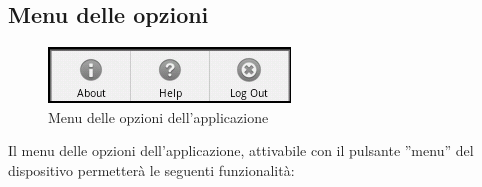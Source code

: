 \subsection{Menu delle opzioni}
	\label{optionsmenu}
	
\begin{center}
\begin{figure}[H]
\centering
\includegraphics[scale=0.70]{images/menu.png}
\caption{ Menu delle opzioni dell'applicazione }
\end{figure}
\end{center}	
	
Il menu delle opzioni dell'applicazione, attivabile con il pulsante ''menu'' del dispositivo permetterà le seguenti funzionalità:
